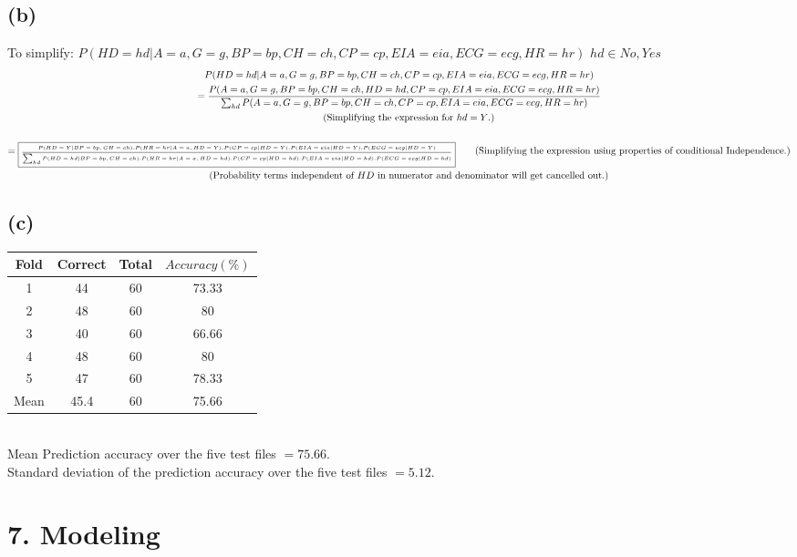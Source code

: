 \documentclass[11pt]{article} %
\begin{document}
\subsection*{(b)}
To simplify: $P(HD=hd|A=a, G=g, BP=bp,  CH=ch, CP=cp, EIA = eia, ECG=ecg, HR=hr)$
$hd \in {No, Yes}$
\begin{gather*}
P(HD=hd|A=a, G=g, BP=bp,  CH=ch, CP=cp, EIA = eia, ECG=ecg, HR=hr)  \\
= \dfrac{P(A=a, G=g, BP=bp,  CH=ch, HD=hd, CP=cp, EIA = eia, ECG=ecg, HR=hr)} {\sum_{hd}P(A=a, G=g, BP=bp,  CH=ch, CP=cp, EIA = eia, ECG=ecg, HR=hr)} \\
\tag{\text{Simplifying the expression for $hd=Y$.}} \\ \\
= 
\tiny \boxed{\dfrac{P(HD=Y| BP=bp, CH=ch).P(HR=hr|A=a,HD=Y).P(CP=cp|HD=Y).P(EIA=eia|HD=Y).P(ECG=ecg|HD=Y)}{\sum_{hd}P(HD=hd| BP=bp, CH=ch).P(HR=hr|A=a,HD=hd).P(CP=cp|HD=hd).P(EIA=eia|HD=hd).P(ECG=ecg|HD=hd)}}
\normalsize
\tag{\text{Simplifying the expression using properties of conditional Independence.}} \\
\tag{\text{Probability terms independent of $HD$ in numerator and denominator will get cancelled out.}}\\
\end{gather*}
\subsection*{(c)}
\begin{tabular}{|c|c|c|c|}\hline
Fold & Correct & Total & $Accuracy(\%) $  \\ \hline
1 & 44 & 60 & 73.33 \\ \hline
2 & 48 & 60 & 80 \\ \hline
3 & 40 & 60 & 66.66 \\ \hline
4 & 48 & 60 & 80 \\ \hline
5 & 47 & 60 & 78.33\\ \hline
Mean & 45.4 & 60 & 75.66 \\\hline
\end{tabular}
\vspace{1em} \\
Mean Prediction accuracy over the five test files $=75.66$. \\
Standard deviation of the prediction accuracy over the five test files $=5.12$.

\section*{7. Modeling}
\end{document}
